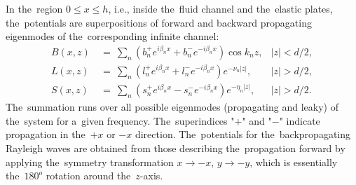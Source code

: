 In the~region $0 \leq x \leq h$, i.e., inside the~fluid channel and the~elastic plates, the~potentials are superpositions of forward and backward propagating eigenmodes of the~corresponding infinite channel:
\begin{align}
B(x,z)~&=~\sum\limits_{n} (b_n^+ e^{i\beta_nx}+b_n^- e^{-i\beta_nx})\cos{k_nz}, &|z| < d/2, \label{pot1} \\
L(x,z)~&=~\sum\limits_{n}({l_n^+}e^{i\beta_nx}+l_n^- e^{-i\beta_nx})e^{-\nu_n|z|}, &|z| > d/2, \label{pot2} \\
S(x,z)~&=~\sum\limits_{n}({s_n^+}e^{i\beta_nx}-{s_n^-}e^{-i\beta_nx})e^{-\eta_n|z|}, &|z| > d/2. \label{pot3}
\end{align}
The~summation runs over all possible eigenmodes (propagating and leaky) of the~system for a~given frequency.
The~superindices "$+$" and "$-$" indicate propagation in the~$+x$ or $-x$ direction.
The~potentials for the~backpropagating Rayleigh waves are obtained from those describing the~propagation forward by applying the~symmetry transformation $x\rightarrow -x$, $y\rightarrow -y$, which is essentially the~$180^{o}$ rotation around the~$z$-axis.


